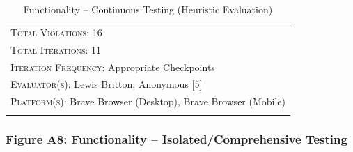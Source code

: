 \documentclass[11pt, english]{article}
\begin{document}
\begin{center}
\begin{longtable}{p{7.5cm}p{0.5cm}p{0.5cm}p{4cm}}
		\hline
                \multicolumn{4}{l}{\textsc{Total Violations}: 16}\\
                \multicolumn{4}{l}{\textsc{Total Iterations}: 11}\\
		\multicolumn{4}{l}{\textsc{Iteration Frequency}: Appropriate Checkpoints}\\
		\multicolumn{4}{l}{\textsc{Evaluator(s)}: Lewis Britton, Anonymous [5]}\\
                \multicolumn{4}{l}{\textsc{Platform(s)}: Brave Browser (Desktop), Brave Browser (Mobile)}\\
                \hline
                \caption{Functionality -- Continuous Testing (Heuristic Evaluation)}
        \end{longtable}
        \end{center}

\newpage

		\subsubsection*{Figure A8: Functionality -- Isolated/Comprehensive Testing}
\end{document}
